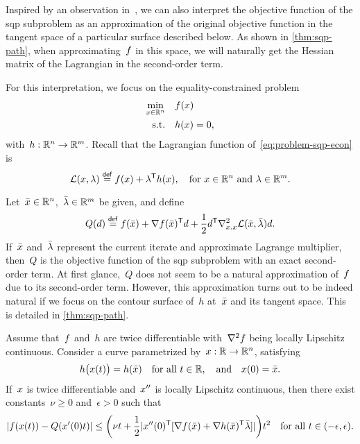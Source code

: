Inspired by an observation in~\cite[\S~2]{Gill_Wong_2011}, we can also interpret the objective function of the \gls{sqp} subproblem as an approximation of the original objective function in the tangent space of a particular surface described below.
As shown in \cref{thm:sqp-path}, when approximating~$f$ in this space, we will naturally get the Hessian matrix of the Lagrangian in the second-order term.

For this interpretation, we focus on the equality-constrained problem
\begin{subequations}
    \label{eq:problem-sqp-econ}
    \begin{align}
        \min_{\iter \in \R^n}   & \quad \obj(\iter)\\
        \text{s.t.}             & \quad h(\iter) = 0,
    \end{align}
\end{subequations}
with~$h : \mathbb{R}^n \to \mathbb{R}^m$.
Recall that the Lagrangian function of~\cref{eq:problem-sqp-econ} is
\begin{equation*}
    \lag(\iter, \lm) \eqdef \obj(\iter) + \lm^{\T} h(\iter), \quad \text{for~$\iter \in \R^n$ and~$\lm \in \R^m$.}
\end{equation*}

Let~$\bar{\iter} \in \R^n$,~$\bar{\lm} \in \R^m$ be given, and define
\begin{equation*}
    Q(\step) \eqdef \obj(\bar{\iter}) + \nabla \obj(\bar{\iter})^{\T} \step + \frac{1}{2} \step^{\T} \nabla_{x, x}^2 \lag(\bar{\iter}, \bar{\lm}) \step.
\end{equation*}
If~$\bar{\iter}$ and~$\bar{\lm}$ represent the current iterate and approximate Lagrange multiplier, then~$Q$ is the objective function of the \gls{sqp} subproblem with an exact second-order term.
At first glance,~$Q$ does not seem to be a natural approximation of~$f$ due to its second-order term.
However, this approximation turns out to be indeed natural if we focus on the contour surface of~$h$ at~$\bar{\iter}$ and its tangent space.
This is detailed in \cref{thm:sqp-path}.

\begin{theorem}
    \label{thm:sqp-path}
    Assume that~$f$ and~$h$ are twice differentiable with~$\nabla^2 f$ being locally Lipschitz continuous.
    Consider a curve parametrized by~$\iter : \R \to \R^n$, satisfying
    \begin{equation}
        \label{eq:sqp-path}
        h \big( \iter(t) \big) = h(\bar{\iter}) \quad \text{for all~$t \in \R$}, \quad \text{and} \quad \iter(0) = \bar{\iter}.
    \end{equation}
    If~$\iter$ is twice differentiable and~$\iter''$ is locally Lipschitz continuous, then there exist constants~$\nu \ge 0$ and~$\epsilon > 0$ such that
    \begin{equation*}
        \abs{\obj(\iter(t)) - Q(x'(0) t)} \le \bigg( \nu t + \frac{1}{2}\abs{\iter''(0)^{\T} [\nabla \obj(\bar{\iter}) + \nabla h(\bar{\iter})^{\T} \bar{\lm}]} \bigg) t^2 \quad \text{for all~$t \in (-\epsilon, \epsilon)$.}
    \end{equation*}
\end{theorem}

